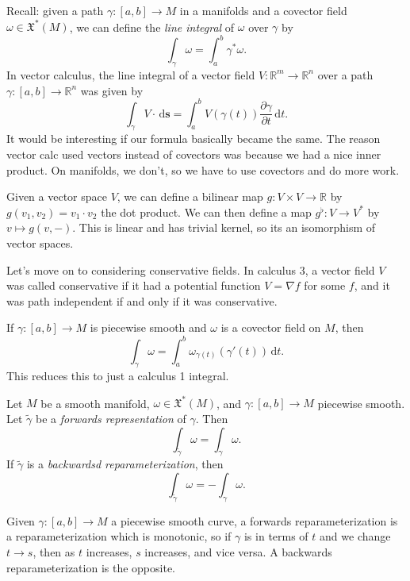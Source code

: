 
Recall: given a path $\gamma : [a,b] \to M$ in a manifolds and a covector field $\omega \in \mathfrak{X} ^*(M)$, we can define the \emph{line integral} of $\omega $ over $\gamma $ by
\[
	\int_\gamma \omega =\int_{a} ^b \gamma ^*\omega 
.\]
In vector calculus, the line integral of a vector field $V : \mathbb{R} ^m \to \mathbb{R} ^n$ over a path $\gamma : [a,b] \to \mathbb{R} ^n$ was given by
\[
	\int_\gamma  V\cdot  \,\mathrm{d} \mathbf{s} =\int_a^b V(\gamma (t)) \frac{\partial \gamma }{\partial t}  \,\mathrm{d} t
.\]
It would be interesting if our formula basically became the same. The reason vector calc used vectors instead of covectors was because we had a nice inner product. On manifolds, we don't, so we have to use covectors and do more work.

Given a vector space $V$, we can define a bilinear map $g : V\times V \to \mathbb{R} $ by $g(v_1,v_2)=v_1\cdot v_2$ the dot product. We can then define a map $g^\flat : V \to V^*$ by $v\mapsto g(v,-)$. This is linear and has trivial kernel, so its an isomorphism of vector spaces.

Let's move on to considering conservative fields. In calculus 3, a vector field $V$ was called conservative if it had a potential function $V=\nabla f$ for some $f$, and it was path independent if and only if it was conservative.

\begin{proposition}\label{3.1.5}
	If $\gamma : [a,b] \to M$ is piecewise smooth and $\omega $ is a covector field on $M$, then
	\[
		\int_\gamma \omega =\int_a^b \omega_{\gamma (t)} (\gamma '(t)) \,\mathrm{d} t
	.\]
	This reduces this to just a calculus 1 integral.
\end{proposition}

\begin{proposition}\label{3.1.6}
	Let $M$ be a smooth manifold, $\omega \in \mathfrak{X} ^*(M)$, and $\gamma : [a,b] \to M$ piecewise smooth. Let $\widetilde{\gamma } $ be a \emph{forwards representation} of $\gamma $. Then
	\[
		\int_{\widetilde{\gamma } } \omega =\int_\gamma \omega 
	.\]
	If $\widetilde{\gamma } $ is a \emph{backwardsd reparameterization}, then
	\[
		\int_{\widetilde{\gamma } } \omega =-\int_\gamma \omega
	.\]
\end{proposition}
\begin{definition}\label{3.1.7}
	Given $\gamma : [a,b] \to M$ a piecewise smooth curve, a forwards reparameterization is a reparameterization which is monotonic, so if $\gamma$ is in terms of $t$ and we change $t\to s$, then as $t$ increases, $s$ increases, and vice versa. A backwards reparameterization is the opposite.
\end{definition}

